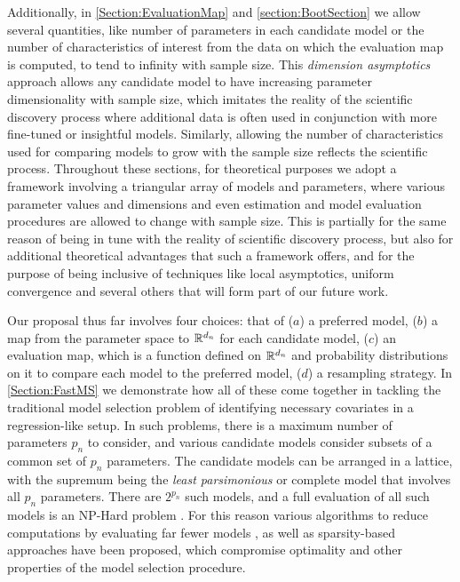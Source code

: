 Additionally, in \ref{Section:EvaluationMap} and \ref{section:BootSection} we allow several quantities, like 
number of parameters in each candidate model or the number of characteristics of interest from the data on which the evaluation map is computed, to tend to infinity with sample size. This {\textit{dimension asymptotics}} approach allows any candidate model to have increasing parameter dimensionality with sample size, which imitates the reality of the scientific discovery process where additional data is often used in 
conjunction with more fine-tuned or insightful models. Similarly, allowing the number of characteristics used for comparing models to grow with the sample size reflects the scientific process. Throughout these sections, for theoretical purposes we adopt a framework involving a triangular array of models and parameters, where various parameter values and dimensions and even estimation and model evaluation procedures are allowed to change with sample size. This is partially for the same reason of being in tune with the reality of scientific discovery process, but also for additional theoretical advantages that such a framework offers, and for the purpose of being inclusive of techniques like local asymptotics, uniform convergence and several others that will form part of our future work.

Our proposal thus far involves four choices: that of ($a$) a preferred model, ($b$) a map from the parameter space to ${\mathbb{R}}^{d_{n}}$ for each candidate model, ($c$) an evaluation map, which is a function defined on ${\mathbb{R}}^{d_{n}}$ and probability distributions on it to compare each model to the preferred model, ($d$) a 
resampling strategy. In \ref{Section:FastMS} we demonstrate how all of these come together in tackling the traditional model selection problem of identifying necessary covariates in a regression-like setup. In such problems, there is a maximum number of parameters $p_{n}$ to consider, and various candidate models consider subsets of a common set of $p_{n}$ parameters. The candidate models can be arranged in a lattice, with the supremum being the {\textit{least parsimonious}} or complete model that involves all $p_{n}$ parameters. There are $2^{p_{n}}$ such models, and a full evaluation of all such models is an NP-Hard problem \citep{Natarajan95}. For this reason various algorithms to reduce computations by evaluating far fewer models \citep{Schwarz78,KonishiKitagawa96}, as well as sparsity-based approaches \citep{Tibshirani96,FanLi01,Zou06} have been proposed, which compromise optimality and other properties of the model selection procedure.

